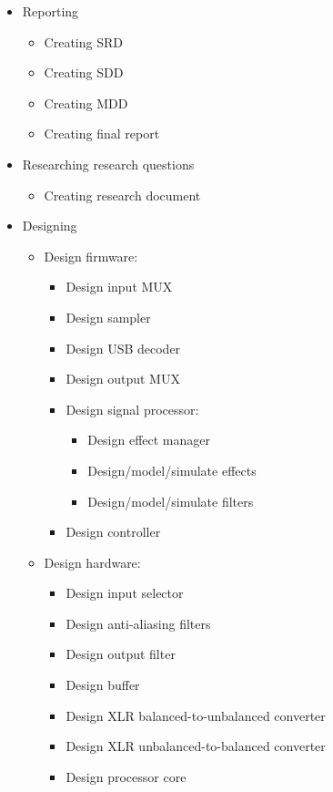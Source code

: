 \begin{itemize}
	\setlength\itemsep{-0.3em}
	\item Reporting
	\begin{itemize}
		\setlength\itemsep{-0.3em}
		\item Creating SRD
		\item Creating SDD
		\item Creating MDD
		\item Creating final report
	\end{itemize}
	\item Researching research questions
	\begin{itemize}
		\setlength\itemsep{-0.3em}
		\item Creating research document
	\end{itemize}
	\item Designing
	\begin{itemize}
		\setlength\itemsep{-0.3em}
		\item Design firmware:
		\begin{itemize}
			\setlength\itemsep{-0.3em}
			\item Design input MUX
			\item Design sampler
			\item Design USB decoder
			\item Design output MUX
			\item Design signal processor:
			\begin{itemize}
				\setlength\itemsep{-0.3em}
				\item Design effect manager
				\item Design/model/simulate effects
				\item Design/model/simulate filters
			\end{itemize}
			\item Design controller
		\end{itemize}
		\item Design hardware:
		\begin{itemize}
			\setlength\itemsep{-0.3em}
			\item Design input selector
			\item Design anti-aliasing filters
			\item Design output filter
			\item Design buffer
			\item Design XLR balanced-to-unbalanced converter
			\item Design XLR unbalanced-to-balanced converter
			\item Design processor core

\end{itemize}
\end{itemize}
\end{itemize}
